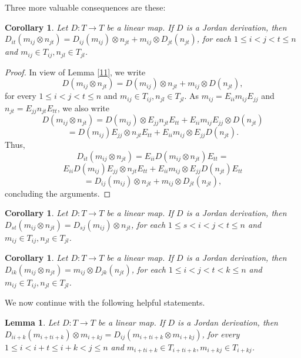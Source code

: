 \documentclass[12pt, reqno]{amsart}
\newtheorem{lemma}[theorem]{Lemma}
\newtheorem{corollary}[theorem]{Corollary}
\theoremstyle{definition}
\numberwithin{equation}{section}
\begin{document}
Three more valuable consequences are these:

\begin{corollary} Let $D : T \longrightarrow T$ be a linear map. If $D$ is a Jordan derivation, then
$D_{it}(m_{ij}\otimes n_{jt})= D_{ij}(m_{ij})\otimes n_{jt}+m_{ij}\otimes D_{jt}(n_{jt})$, for each $1\leq i< j< t\leq n$ and $m_{ij}\in T_{ij}, n_{jl}\in T_{jl}$.
\end{corollary}

\begin{proof}
In view of Lemma \ref{11}, we write $$D (m_{ij}\otimes n_{jt})= D (m_{ij})\otimes n_{jt}+m_{ij}\otimes D (n_{jt}),$$ for every $1\leq i< j< t\leq n$ and $m_{ij}\in T_{ij}, n_{jl}\in T_{jl}$. As $m_{ij}=E_{ii}m_{ij}E_{jj}$ and $n_{jt}=E_{jj}n_{jt}E_{tt}$, we also write $$D (m_{ij}\otimes n_{jt})=D (m_{ij})\otimes E_{jj}n_{jt}E_{tt}+E_{ii}m_{ij}E_{jj}\otimes D (n_{jt})$$$$=D (m_{ij})E_{jj}\otimes n_{jt}E_{tt}+E_{ii}m_{ij}\otimes E_{jj}D (n_{jt}).$$ Thus, $$D_{it}(m_{ij}\otimes n_{jt})=E_{ii}D (m_{ij}\otimes n_{jt})E_{tt}=$$$$E_{ii}D (m_{ij})E_{jj}\otimes n_{jt}E_{tt}+E_{ii}m_{ij}\otimes E_{jj}D (n_{jt})E_{tt}$$$$=D_{ij} (m_{ij})\otimes n_{jt}+ m_{ij}\otimes  D _{jt}(n_{jt}),$$ concluding the arguments.
\end{proof}

\begin{corollary} Let $D : T \longrightarrow T$ be a linear map. If $D$ is a Jordan derivation, then
$D_{st}(m_{ij}\otimes n_{jt})= D_{sj}(m_{ij})\otimes n_{jt}$, for each $1\leq s< i< j< t\leq n$ and $m_{ij}\in T_{ij}, n_{jl}\in T_{jl}$.
\end{corollary}

\begin{corollary} Let $D : T \longrightarrow T$ be a linear map. If $D$ is a Jordan derivation, then
$D_{ik}(m_{ij}\otimes n_{jt})=  m_{ij}\otimes D_{jk}(n_{jt})$, for each $1\leq i< j< t< k\leq n$ and $m_{ij}\in T_{ij}, n_{jl}\in T_{jl}$.
\end{corollary}

We now continue with the following helpful statements.

\begin{lemma}\label{12} Let $D : T \longrightarrow T$ be a linear map. If $D$ is a Jordan derivation, then
$D_{ii+k}(m_{i+ti+k})\otimes m_{i+kj}=D_{ij}( m_{i+ti+k}\otimes m_{i+kj})$, for every $1\leq i <i+t\leq i+k< j \leq n$ and $m_{i+ti+k}\in T_{i+ti+k}, m_{i+kj}\in T_{i+kj}$.
\end{lemma}
\end{document}
